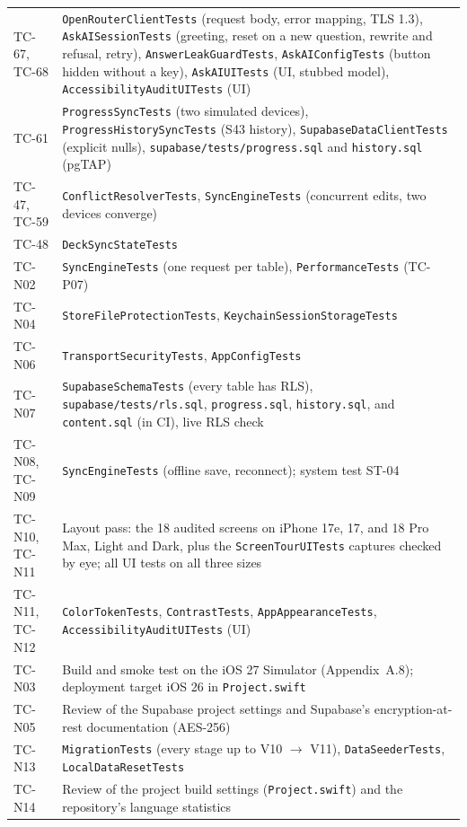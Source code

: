 \documentclass[12pt,letterpaper]{article}
\begin{document}
\begin{xltabular}{\textwidth}{@{}L{2.4cm} Y@{}}
TC-67, TC-68 & \texttt{OpenRouterClientTests} (request body, error mapping, TLS 1.3), \texttt{AskAISessionTests} (greeting, reset on a new question, rewrite and refusal, retry), \texttt{AnswerLeakGuardTests}, \texttt{AskAIConfigTests} (button hidden without a key), \texttt{AskAIUITests} (UI, stubbed model), \texttt{AccessibilityAuditUITests} (UI) \\
TC-61 & \texttt{ProgressSyncTests} (two simulated devices), \texttt{ProgressHistorySyncTests} (S43 history), \texttt{SupabaseDataClientTests} (explicit nulls), \texttt{supabase/tests/progress.sql} and \texttt{history.sql} (pgTAP) \\
TC-47, TC-59 & \texttt{ConflictResolverTests}, \texttt{SyncEngineTests} (concurrent edits, two devices converge) \\
TC-48 & \texttt{DeckSyncStateTests} \\
TC-N02 & \texttt{SyncEngineTests} (one request per table), \texttt{PerformanceTests} (TC-P07) \\
TC-N04 & \texttt{StoreFileProtectionTests}, \texttt{KeychainSessionStorageTests} \\
TC-N06 & \texttt{TransportSecurityTests}, \texttt{AppConfigTests} \\
TC-N07 & \texttt{SupabaseSchemaTests} (every table has RLS), \texttt{supabase/tests/rls.sql}, \texttt{progress.sql}, \texttt{history.sql}, and \texttt{content.sql} (in CI), live RLS check \\
TC-N08, TC-N09 & \texttt{SyncEngineTests} (offline save, reconnect); system test ST-04 \\
TC-N10, TC-N11 & Layout pass: the 18 audited screens on iPhone 17e, 17, and 18 Pro Max, Light and Dark, plus the \texttt{ScreenTourUITests} captures checked by eye; all UI tests on all three sizes \\
TC-N11, TC-N12 & \texttt{ColorTokenTests}, \texttt{ContrastTests}, \texttt{AppAppearanceTests}, \texttt{AccessibilityAuditUITests} (UI) \\
TC-N03 & Build and smoke test on the iOS 27 Simulator (Appendix~A.8); deployment target iOS 26 in \texttt{Project.swift} \\
TC-N05 & Review of the Supabase project settings and Supabase's encryption-at-rest documentation (AES-256) \\
TC-N13 & \texttt{MigrationTests} (every stage up to V10 $\to$ V11), \texttt{DataSeederTests}, \texttt{LocalDataResetTests} \\
TC-N14 & Review of the project build settings (\texttt{Project.swift}) and the repository's language statistics \\

\end{xltabular}
\end{document}

